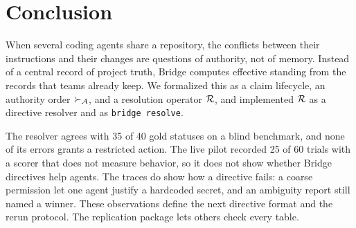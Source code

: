 \section{Conclusion}
\label{sec:conclusion}

When several coding agents share a repository, the conflicts between their instructions and their changes are questions of authority, not of memory. Instead of a central record of project truth, Bridge computes effective standing from the records that teams already keep. We formalized this as a claim lifecycle, an authority order $\succ_{\mathcal{A}}$, and a resolution operator $\mathcal{R}$, and implemented $\mathcal{R}$ as a directive resolver and as \texttt{bridge resolve}.

The resolver agrees with 35 of 40 gold statuses on a blind benchmark, and none of its errors grants a restricted action. The live pilot recorded 25 of 60 trials with a scorer that does not measure behavior, so it does not show whether Bridge directives help agents. The traces do show how a directive fails: a coarse permission let one agent justify a hardcoded secret, and an ambiguity report still named a winner. These observations define the next directive format and the rerun protocol. The replication package lets others check every table.
